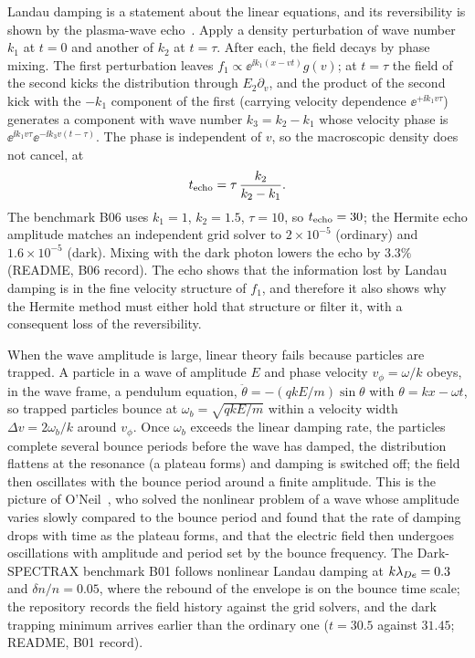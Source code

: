 Landau damping is a statement about the linear equations, and its reversibility is shown by the plasma-wave echo~\citep{Gould1967}. Apply a density perturbation of wave number $k_1$ at $t=0$ and another of $k_2$ at $t=\tau$. After each, the field decays by phase mixing. The first perturbation leaves $f_1\propto\ee^{\ii k_1(x-vt)}g(v)$; at $t=\tau$ the field of the second kicks the distribution through $E_2\partial_v$, and the product of the second kick with the $-k_1$ component of the first (carrying velocity dependence $\ee^{+\ii k_1v\tau}$) generates a component with wave number $k_3=k_2-k_1$ whose velocity phase is $\ee^{\ii k_1v\tau}\ee^{-\ii k_3v(t-\tau)}$. The phase is independent of $v$, so the macroscopic density does not cancel, at
\begin{equation}
t_{\rm echo}=\tau\,\frac{k_2}{k_2-k_1}.
\end{equation}
The benchmark B06 uses $k_1=1$, $k_2=1.5$, $\tau=10$, so $t_{\rm echo}=30$; the Hermite echo amplitude matches an independent grid solver to $2\times10^{-5}$ (ordinary) and $1.6\times10^{-5}$ (dark). Mixing with the dark photon lowers the echo by $3.3\%$ (README, B06 record). The echo shows that the information lost by Landau damping is in the fine velocity structure of $f_1$, and therefore it also shows why the Hermite method must either hold that structure or filter it, with a consequent loss of the reversibility.

When the wave amplitude is large, linear theory fails because particles are trapped. A particle in a wave of amplitude $E$ and phase velocity $v_\phi=\omega/k$ obeys, in the wave frame, a pendulum equation, $\ddot\theta=-(qkE/m)\sin\theta$ with $\theta=kx-\omega t$, so trapped particles bounce at $\omega_b=\sqrt{qkE/m}$ within a velocity width $\Delta v=2\omega_b/k$ around $v_\phi$. Once $\omega_b$ exceeds the linear damping rate, the particles complete several bounce periods before the wave has damped, the distribution flattens at the resonance (a plateau forms) and damping is switched off; the field then oscillates with the bounce period around a finite amplitude. This is the picture of O'Neil~\citep{ONeil1965}, who solved the nonlinear problem of a wave whose amplitude varies slowly compared to the bounce period and found that the rate of damping drops with time as the plateau forms, and that the electric field then undergoes oscillations with amplitude and period set by the bounce frequency. The Dark-SPECTRAX benchmark B01 follows nonlinear Landau damping at $k\lambda_{De}=0.3$ and $\delta n/n=0.05$, where the rebound of the envelope is on the bounce time scale; the repository records the field history against the grid solvers, and the dark trapping minimum arrives earlier than the ordinary one ($t=30.5$ against $31.45$; README, B01 record).

